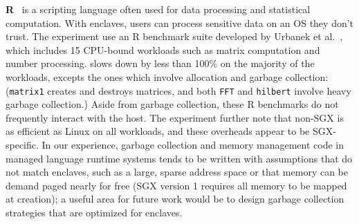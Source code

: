{\bf R}~\cite{r-project} is a scripting language often used for
data processing and statistical computation.
With enclaves, users can process sensitive data on an
OS they don't trust.
The experiment use an R benchmark suite developed by Urbanek et al.~\cite{r-benchmark-25}, which includes 15 CPU-bound workloads such as matrix computation and number processing.
\graphenesgx{} slows down by less than 100\% on the majority of the workloads, excepts the ones which involve allocation and garbage collection: ({\tt matrix1} creates and destroys matrices, and both {\tt FFT} and {\tt hilbert} involve heavy garbage collection.)
Aside from garbage collection, these R benchmarks do not frequently interact with the host.
The experiment further note that non-SGX \graphene{} is as efficient as Linux on all workloads, 
and these overheads appear to be SGX-specific.
In our experience, garbage collection and memory management code in managed language runtime
systems tends to be written with assumptions that do not match enclaves,
such as a large, sparse address space or that memory can be demand paged 
nearly for free (SGX version 1 requires all memory to be mapped
at creation); a useful area for future work would be to design
garbage collection strategies that are optimized for enclaves.

